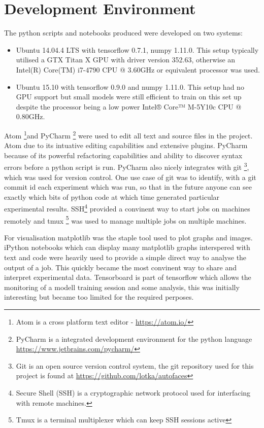   \section{Development Environment}
    The python scripts and notebooks produced were developed on two systems:
    \begin{itemize}
      \item     Ubuntu 14.04.4 LTS with tensorflow 0.7.1, numpy 1.11.0. This setup typically utilised a GTX Titan X GPU with driver version 352.63, otherwise
                an Intel(R) Core(TM) i7-4790 CPU @ 3.60GHz or equivalent processor was used.
      \item     Ubuntu 15.10 with tensorflow 0.9.0 and numpy 1.11.0. This setup had no GPU support but small models were still efficient to train on this set up
                despite the processor being a low power Intel® Core™ M-5Y10c CPU @ 0.80GHz.
    \end{itemize}
    Atom \footnote{Atom is a cross platform text editor - \url{https://atom.io/}}and PyCharm \footnote{PyCharm is a integrated development environment for the python language \url{https://www.jetbrains.com/pycharm/}} were used to edit all text and source files in the project.
    Atom due to its intuative editing capabilities and extensive plugins. PyCharm because
    of its powerful refactoring capabilities and ability to discover syntax errors before
    a python script is run. PyCharm also nicely integrates with git \footnote{Git is an open source version control system,
    the git repository used for this project is found at \url{https://github.com/lotka/autofaces}}, which was used for version control.
    One use case of git was to identify, with a git commit id each experiment which was run, so that in the future
    anyone can see exactly which bits of python code at which time generated particular experimental results.
    SSH\footnote{Secure Shell (SSH) is a cryptographic network protocol used for interfacing with remote machines.} provided a convinent way to start jobs on machines remotely and tmux \footnote{Tmux is a terminal
    multiplexer which can keep SSH sessions active} was used to manage multiple jobs on multiple machines.

    For visualisation matplotlib was the staple tool used to plot graphs and images. iPython notebooks
    which can display many matplotlib graphs interspered with text and code were heavily used to
    provide a simple direct way to analyse the output of a job. This quickly became the most convinent way to
    share and interpret experimental data. Tensorboard is part of tensorflow which allows the monitoring of a
    modell training session and some analysis, this was initially interesting but became too limited for the required perposes.
